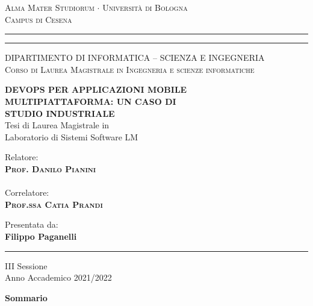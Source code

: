 
\begin{titlepage}
\begin{center}
{{\Large{\textsc{Alma Mater Studiorum $\cdot$ Universit\`a di
Bologna\\\vspace{2mm}Campus di Cesena}}}} 
\rule[0.1cm]{15.8cm}{0.1mm}
\rule[0.5cm]{15.8cm}{0.6mm}

{\small{\textsc { DIPARTIMENTO DI INFORMATICA – SCIENZA E INGEGNERIA \\
\vspace{3mm}
Corso di Laurea Magistrale in Ingegneria e scienze informatiche}}}
\end{center}
\vspace{15mm}
\begin{center}
{\LARGE\textbf{DEVOPS PER APPLICAZIONI MOBILE}} \\
\vspace{3mm}
{\LARGE\textbf{MULTIPIATTAFORMA: UN CASO DI}} \\
\vspace{3mm}
{\LARGE\textbf{STUDIO INDUSTRIALE}} \\
\vspace{20mm} {\large{\sc Tesi di Laurea Magistrale in\\ Laboratorio di Sistemi Software LM}}
\end{center}
\vfill
\par
\noindent

\begin{minipage}[t]{0.47\textwidth}
{\large{\sc Relatore:}\\
{\bf \textsc{Prof. Danilo Pianini}}}\\ \\
{\large{\sc Correlatore:}\\
{\bf \textsc{Prof.ssa Catia Prandi}}}\\
\vskip 8pt
\end{minipage}
\hfill
\begin{minipage}[t]{0.47\textwidth}\raggedleft
{\large{\sc Presentata da:}\\
{\bf Filippo Paganelli}}
\end{minipage}
\vspace{20mm}
\begin{center}
\rule[0.1cm]{15.8cm}{0.2mm}
{\large{\sc III Sessione\\
Anno Accademico 2021/2022}}
\end{center}
\end{titlepage}

\newpage

\begin{center}
{\LARGE{\bf Sommario}}
\end{center}
{
\noindent

}